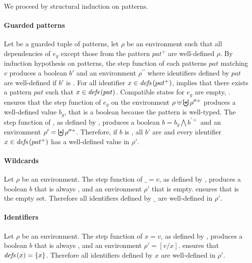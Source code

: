 \begin{skippableproof}
    We proceed by structural induction on patterns.

    \paragraph{Guarded patterns}
    Let  be a guarded tuple of patterns, let $\rho$ be an environment such
    that all dependencies of $e_g$ except those from the pattern $pat^+$ are well-defined $\rho$.
    By induction hypothesis on patterns, the step function of each patterns $pat$ matching $v$
    produces a boolean $b'$ and an environment $\rho^{\prime\prime}$ where identifiers defined by
    $pat$ are well-defined if $b'$ is \true.
    For all identifier $x \in {\ensuremath{\textit{defs}\left(pat^+\right)}}$,  implies
    that there exists a pattern $pat$ such that $x \in {\ensuremath{\textit{defs}\left(pat\right)}}$.
    Compatible states for $e_g$ are empty, \cf {}.
     ensures that the step function of $e_g$ on
    the environment $\rho \uplus \biguplus \rho^{\prime\prime+}$ produces a well-defined value
    $b_g$, that is a boolean because the pattern is well-typed.
    The step function of , as defined by
    , produces a boolean
    $b = b_g \bigwedge b^{\prime+}$ and an environment
    $\rho' = \biguplus \rho^{\prime\prime+}$. Therefore, if $b$ is \true, all $b'$ are
    \true and every identifier $x \in {\ensuremath{\textit{defs}\left(pat^+\right)}}$ has a well-defined value in $\rho'$.

    \paragraph{Wildcards}
    Let $\rho$ be an environment. The step function of $\_ = v$, as defined by , produces a boolean $b$ that is always \true, and
    an environment $\rho'$ that is empty. 
    ensures that  is the empty set. Therefore all identifiers defined by $\_$ are
    well-defined in $\rho'$.

    \paragraph{Identifiers}
    Let $\rho$ be an environment. The step function of $x = v$, as defined by , produces a boolean $b$ that is always \true,
    and an environment $\rho' = [v / x]$. 
    ensures that ${\textit{defs}\left(x\right)} = \{ x \}$. Therefore all identifiers defined by $x$ are well-defined in
    $\rho'$.


\end{skippableproof}
